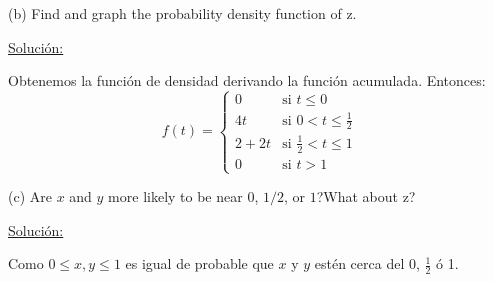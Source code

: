 \documentclass{report}
\newcommand{\s}{\underline{Soluci\'{o}n:}}
\begin{document}
	(b) Find and graph the probability density function of z.
	
	\s 
	
	Obtenemos la función de densidad derivando la función acumulada. Entonces:
	\[
	f(t)=
	\begin{cases}
	0 & \text{si $t \leq 0$} \\
	4t & \text{si $0<t\leq \frac{1}{2}$}\\
	2+2t & \text{si $\frac{1}{2} < t \leq 1$}\\
	0 & \text{si $t>1$}
	\end{cases}
	\]
	
	
	(c) Are $x$ and $y$ more likely to be near $0$, $1/2$, or $1$?What about z?
	
	\s 
	
	Como $0 \leq x, y \leq 1$ es igual de probable que $x$ y $y$ estén cerca del 0, $\frac{1}{2}$ ó 1.
	
\end{document}
